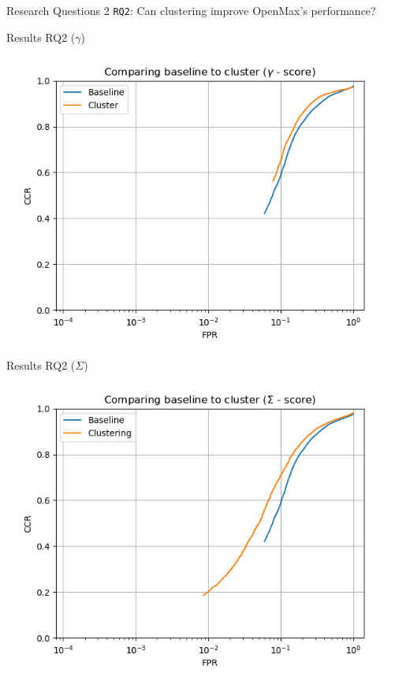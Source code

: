 %
\begin{frame}{Research Questions 2}
	\texttt{RQ2}: Can clustering improve OpenMax's performance?
\end{frame}

\begin{frame}{Results RQ2 ($\gamma$)}
	\includegraphics[width=\textwidth]{figures/compare_gamma.png}
\end{frame}

\begin{frame}{Results RQ2 ($\Sigma$)}
	\includegraphics[width=\textwidth]{figures/compare_sigma.png}
\end{frame}

